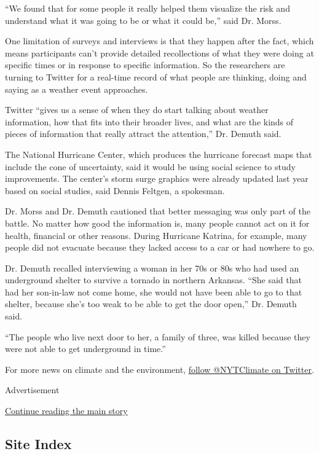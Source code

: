 ``We found that for some people it really helped them visualize the risk
and understand what it was going to be or what it could be,'' said Dr.
Morss.

One limitation of surveys and interviews is that they happen after the
fact, which means participants can't provide detailed recollections of
what they were doing at specific times or in response to specific
information. So the researchers are turning to Twitter for a real-time
record of what people are thinking, doing and saying as a weather event
approaches.

Twitter ``gives us a sense of when they do start talking about weather
information, how that fits into their broader lives, and what are the
kinds of pieces of information that really attract the attention,'' Dr.
Demuth said.

The National Hurricane Center, which produces the hurricane forecast
maps that include the cone of uncertainty, said it would be using social
science to study improvements. The center's storm surge graphics were
already updated last year based on social studies, said Dennis Feltgen,
a spokesman.

Dr. Morss and Dr. Demuth cautioned that better messaging was only part
of the battle. No matter how good the information is, many people cannot
act on it for health, financial or other reasons. During Hurricane
Katrina, for example, many people did not evacuate because they lacked
access to a car or had nowhere to go.

Dr. Demuth recalled interviewing a woman in her 70s or 80s who had used
an underground shelter to survive a tornado in northern Arkansas. ``She
said that had her son-in-law not come home, she would not have been able
to go to that shelter, because she's too weak to be able to get the door
open,'' Dr. Demuth said.

``The people who live next door to her, a family of three, was killed
because they were not able to get underground in time.''

For more news on climate and the environment,
\href{https://twitter.com/nytclimate}{follow @NYTClimate on Twitter}.

Advertisement

\protect\hyperlink{after-bottom}{Continue reading the main story}

\hypertarget{site-index}{%
\subsection{Site Index}\label{site-index}}

